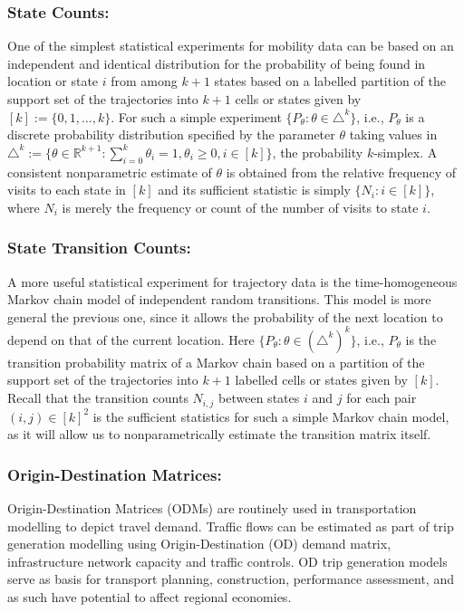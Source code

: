 \documentclass{llncs}
\begin{document}
\subsubsection{State Counts:}
One of the simplest statistical experiments for mobility data can be based on an independent and identical distribution for the probability of being found in location or state $i$ from among $k+1$ states based on a labelled partition of the support set of the trajectories into $k+1$ cells or states given by $[k] := \{0,1,\ldots,k\}$.  
For such a simple experiment $\{P_{\theta}: \theta \in \triangle^k \}$, i.e., $P_{\theta}$ is a discrete probability distribution specified by the 
parameter $\theta$ taking values in 
$\triangle^k := \{ \theta \in \mathbb{R}^{k+1} : \sum_{i=0}^k \theta_i = 1, \theta_i \geq 0, i \in [k] \}$, 
the probability $k$-simplex. 
A consistent nonparametric estimate of $\theta$ is obtained from the relative frequency of visits to each state in $[k]$ and its sufficient statistic is simply $\{N_i: i \in [k]\}$, where $N_i$ is merely the frequency or count of the number of visits to state $i$.  

\subsubsection{State Transition Counts:}
A more useful statistical experiment for trajectory data is the time-homogeneous Markov chain model of independent random transitions. This model is more general the previous one, since it allows the probability of the next location to depend on that of the current location.   
Here $\{P_{\theta}: \theta \in (\triangle^k)^k\}$, i.e., $P_{\theta}$ is the transition probability matrix of a Markov chain based on a partition of the support set of the trajectories into $k+1$ labelled cells or states given by $[k]$.  
Recall that the transition counts $N_{i,j}$ between states $i$ and $j$ for each pair $(i,j) \in [k]^2$ is the sufficient statistics for such a simple Markov chain model, as it will allow us to nonparametrically estimate the transition matrix itself.  

\subsubsection{Origin-Destination Matrices:}
Origin-Destination Matrices (ODMs) are routinely used in transportation modelling to depict travel demand.  
Traffic flows can be estimated as part of trip generation modelling using Origin-Destination (OD) demand matrix, infrastructure network capacity and traffic controls. 
OD trip generation models serve as basis for transport planning, construction, performance assessment, and as such have potential to affect regional economies. 
\end{document}

